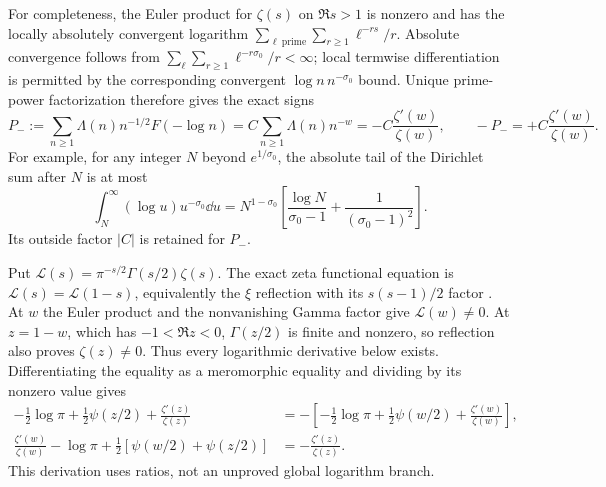 For completeness, the Euler product for $\zeta(s)$ on $\Re s>1$
\cite{a03ma:Zeta} is nonzero and has the locally absolutely convergent logarithm
$\sum_{\ell\ \mathrm{prime}}\sum_{r\ge1}\ell^{-rs}/r$.
Absolute convergence follows from
$\sum_\ell\sum_{r\ge1}\ell^{-r\sigma_0}/r<\infty$;
local termwise differentiation is permitted by the corresponding convergent
$\log n\,n^{-\sigma_0}$ bound. Unique prime-power factorization therefore
gives the exact signs
\begin{equation}\tag{MA20}
 P_-:=\sum_{n\ge1}\Lambda(n)n^{-1/2}F(-\log n)
 =C\sum_{n\ge1}\Lambda(n)n^{-w}
 =-C\frac{\zeta'(w)}{\zeta(w)},\qquad
 -P_-=+C\frac{\zeta'(w)}{\zeta(w)}.
\end{equation}
For example, for any integer $N$ beyond $e^{1/\sigma_0}$, the absolute tail
of the Dirichlet sum after $N$ is at most
\[
 \int_N^\infty(\log u)u^{-\sigma_0}\dd u
 =N^{1-\sigma_0}\left[\frac{\log N}{\sigma_0-1}
                       +\frac1{(\sigma_0-1)^2}\right].
\]
Its outside factor $|C|$ is retained for $P_-$.

Put $\mathscr L(s)=\pi^{-s/2}\Gamma(s/2)\zeta(s)$.
The exact zeta functional equation is $\mathscr L(s)=\mathscr L(1-s)$,
equivalently the $\xi$ reflection with its $s(s-1)/2$ factor
\cite{a03ma:Zeta}. At $w$ the Euler product and the nonvanishing Gamma factor
give $\mathscr L(w)\ne0$. At $z=1-w$, which has $-1<\Re z<0$,
$\Gamma(z/2)$ is finite and nonzero, so reflection also proves
$\zeta(z)\ne0$. Thus every logarithmic derivative below exists.
Differentiating the equality as a meromorphic equality and dividing by its
nonzero value gives
\begin{equation}\tag{MA21}\begin{aligned}
 -\tfrac12\log\pi+\tfrac12\psi(z/2)+\frac{\zeta'(z)}{\zeta(z)}
 &=-\left[-\tfrac12\log\pi+\tfrac12\psi(w/2)
                           +\frac{\zeta'(w)}{\zeta(w)}\right],\\
 \frac{\zeta'(w)}{\zeta(w)}-\log\pi
 +\tfrac12[\psi(w/2)+\psi(z/2)]
 &=-\frac{\zeta'(z)}{\zeta(z)}.
\end{aligned}\end{equation}
This derivation uses ratios, not an unproved global logarithm branch.

